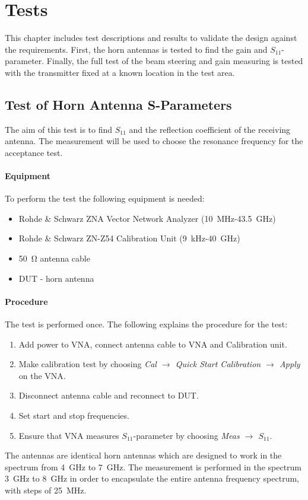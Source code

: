 \chapter{Tests}
This chapter includes test descriptions and results to validate the design against the requirements. First, the horn antennas is tested to find the gain and $S_{11}$-parameter. Finally, the full test of the beam steering and gain measuring is tested with the transmitter fixed at a known location in the test area.

\section{Test of Horn Antenna S-Parameters} \label{s:sparam_test}
The aim of this test is to find $S_{11}$ and the reflection coefficient of the receiving antenna. The measurement will be used to choose the resonance frequency for the acceptance test.

\subsubsection{Equipment}
To perform the test the following equipment is needed:
\begin{itemize}
    \item Rohde \& Schwarz ZNA Vector Network Analyzer (\SI{10}{\mega\hertz}-\SI{43.5}{\giga\hertz})
    \item Rohde \& Schwarz ZN-Z54 Calibration Unit (\SI{9}{\kilo\hertz}-\SI{40}{\giga\hertz})
    \item \SI{50}{\ohm} antenna cable
    \item DUT - horn antenna
\end{itemize}

\subsubsection{Procedure}
The test is performed once. The following explains the procedure for the test:
\begin{enumerate}
    \item Add power to VNA, connect antenna cable to VNA and Calibration unit.
    \item Make calibration test by choosing \textit{Cal $\rightarrow$ Quick Start Calibration $\rightarrow$ Apply} on the VNA.
    \item Disconnect antenna cable and reconnect to DUT.
    \item Set start and stop frequencies. 
    \item Ensure that VNA measures $S_{11}$-parameter by choosing \textit{Meas $\rightarrow$ $S_{11}$}.
\end{enumerate}
The antennas are identical horn antennas which are designed to work in the spectrum from \SI{4}{\giga\hertz} to \SI{7}{\giga\hertz}. The measurement is performed in the spectrum \SI{3}{\giga\hertz} to \SI{8}{\giga\hertz} in order to encapsulate the entire antenna frequency spectrum, with steps of \SI{25}{\mega\hertz}. 

